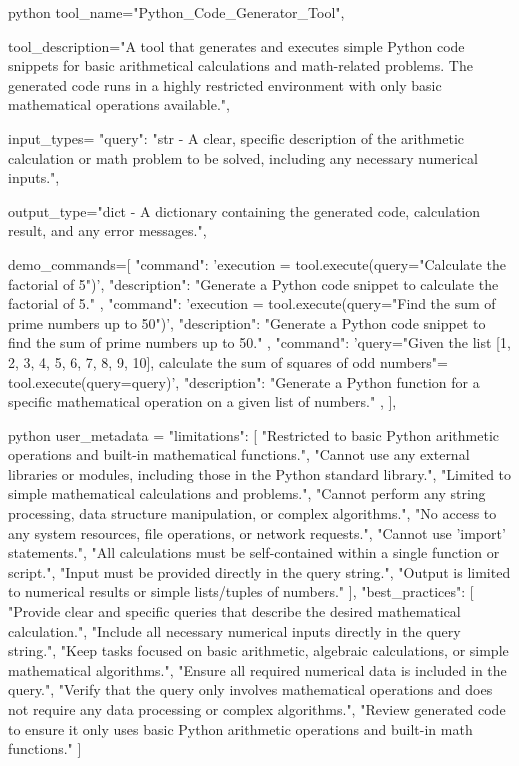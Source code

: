 \begin{codecolorbox}{python}
tool_name="Python_Code_Generator_Tool",

tool_description="A tool that generates and executes simple Python code snippets for basic arithmetical calculations and math-related problems. The generated code runs in a highly restricted environment with only basic mathematical operations available.",

input_types={
    "query": "str - A clear, specific description of the arithmetic calculation or math problem to be solved, including any necessary numerical inputs."},

output_type="dict - A dictionary containing the generated code, calculation result, and any error messages.",

demo_commands=[
    {
        "command": 'execution = tool.execute(query="Calculate the factorial of 5")',
        "description": "Generate a Python code snippet to calculate the factorial of 5."
    },
    {
        "command": 'execution = tool.execute(query="Find the sum of prime numbers up to 50")',
        "description": "Generate a Python code snippet to find the sum of prime numbers up to 50."
    },
    {
        "command": 'query="Given the list [1, 2, 3, 4, 5, 6, 7, 8, 9, 10], calculate the sum of squares of odd numbers"\nexecution = tool.execute(query=query)',
        "description": "Generate a Python function for a specific mathematical operation on a given list of numbers."
    },
],
\end{codecolorbox}

\begin{codecolorbox}{python}
user_metadata = {
    "limitations": [
        "Restricted to basic Python arithmetic operations and built-in mathematical functions.",
        "Cannot use any external libraries or modules, including those in the Python standard library.",
        "Limited to simple mathematical calculations and problems.",
        "Cannot perform any string processing, data structure manipulation, or complex algorithms.",
        "No access to any system resources, file operations, or network requests.",
        "Cannot use 'import' statements.",
        "All calculations must be self-contained within a single function or script.",
        "Input must be provided directly in the query string.",
        "Output is limited to numerical results or simple lists/tuples of numbers."
    ],
    "best_practices": [
        "Provide clear and specific queries that describe the desired mathematical calculation.",
        "Include all necessary numerical inputs directly in the query string.",
        "Keep tasks focused on basic arithmetic, algebraic calculations, or simple mathematical algorithms.",
        "Ensure all required numerical data is included in the query.",
        "Verify that the query only involves mathematical operations and does not require any data processing or complex algorithms.",
        "Review generated code to ensure it only uses basic Python arithmetic operations and built-in math functions."
    ]
}
\end{codecolorbox}


